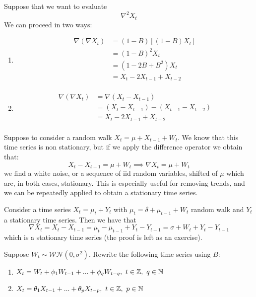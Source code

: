 \begin{example}
    Suppose that we want to evaluate
    \[
        \nabla^2X_t  
    \]
    We can proceed in two ways:
    \begin{enumerate}
        \item \begin{equation*}
            \begin{split}
                \nabla(\nabla X_t)&=(1-B)[(1-B)X_t]\\
                &=(1-B)^2X_t\\
                &=(1-2B+B^2)X_t\\
                &=X_t-2X_{t-1}+X_{t-2}\\
            \end{split}
        \end{equation*}
        \item \begin{equation*}
            \begin{split}
                \nabla(\nabla X_t)&=\nabla(X_t-X_{t-1})\\
                &=(X_t-X_{t-1})-(X_{t-1}-X_{t-2})\\
                &=X_t-2X_{t-1}+X_{t-2}\\
            \end{split}
        \end{equation*}
    \end{enumerate}
\end{example}

\begin{example}
    Suppose to consider a random walk $X_t=\mu+X_{t-1}+W_t$. We know that this time series is non stationary, but if we apply the difference operator we obtain that:
    \[
        X_t-X_{t-1}=\mu+W_t\implies\nabla X_t=\mu+W_t  
    \]
    we find a white noise, or a sequence of iid random variables, shifted of $\mu$ which are, in both cases, stationary. This is especially useful for removing trends, and we can be repeatedly applied to obtain a stationary time series.
\end{example}

\begin{example}
    Consider a time series $X_t=\mu_t+Y_t$ with $\mu_t=\delta+\mu_{t-1}+W_t$ random walk and $Y_t$ a stationary time series. Then we have that
    \[
        \nabla X_t=X_t-X_{t-1}=\mu_t-\mu_{t-1}+Y_t-Y_{t-1}=\sigma+W_t+Y_t-Y_{t-1}  
    \]
    which is a stationary time series (the proof is left as an exercise).
\end{example}

\begin{exercise}
    Suppose $W_t\sim\mathcal{WN}(0,\sigma^2)$. Rewrite the following time series using $B$:
    \begin{enumerate}
        \item $X_t=W_t+\phi_1W_{t-1}+...+\phi_qW_{t-q},\ t\in\Z,\ q\in\N$
        \item $X_t=\theta_1X_{t-1}+...+\theta_pX_{t-p},\ t\in\Z,\ p\in\N$
    \end{enumerate}
\end{exercise}
